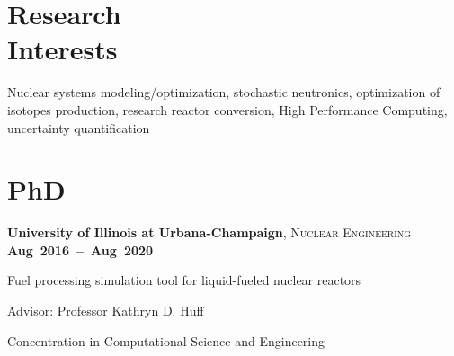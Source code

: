 \documentclass[margin,line]{resume}
\begin{document}
\begin{resume}
    \section{\mysidestyle Research\\Interests}
		Nuclear systems modeling/optimization, stochastic neutronics, 
		optimization of isotopes production, research reactor 
		conversion, High Performance Computing, uncertainty quantification
    \section{\mysidestyle PhD}
    \textbf{University of Illinois at Urbana-Champaign}, \textsc{Nuclear 
    Engineering} \hfill\textbf{\mbox{Aug 2016 -- Aug 
    2020}}\vspace{-3mm}\\\vspace{-1mm}%
    \begin{list2}
        \item Fuel processing simulation tool for liquid-fueled nuclear reactors
        \item Advisor:  Professor Kathryn D. Huff
        \item Concentration in Computational Science and Engineering
    \end{list2}\vspace{-1.5mm}

\end{resume}
\end{document}
